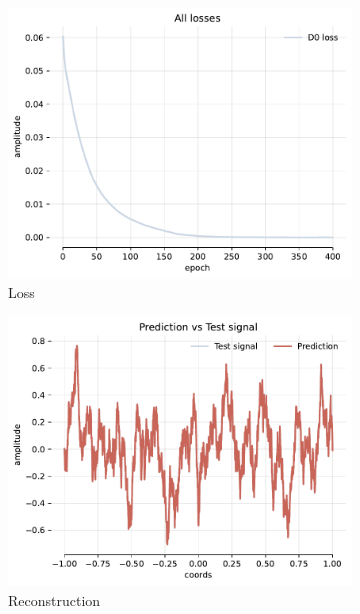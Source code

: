 \begin{figure}[h]
    \centering
    \begin{subfigure}[b]{0.32\textwidth}
        \centering
        \includegraphics[width=\textwidth]{img/ch3/loss-noise-hf4096-w512.pdf}
        \caption{Loss}
    \end{subfigure}
    \begin{subfigure}[b]{0.32\textwidth}
        \centering
        \includegraphics[width=\textwidth]{img/ch3/pred-noise-hf4096-w512.pdf}
        \caption{Reconstruction}
    \end{subfigure}
    \begin{subfigure}[b]{0.32\textwidth}

\end{subfigure}
\end{figure}
